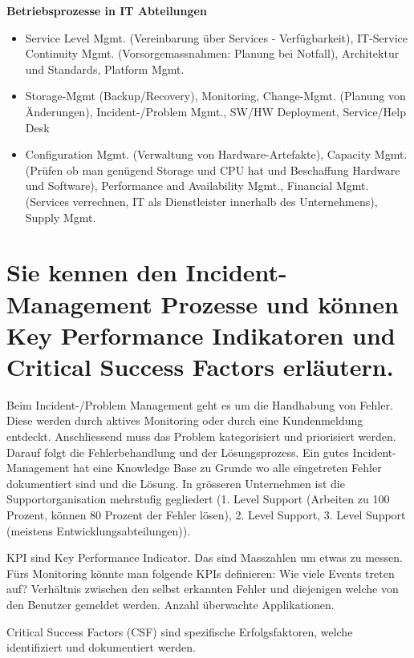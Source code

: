 \textbf{Betriebsprozesse in IT Abteilungen}
\begin{itemize}
	\item Service Level Mgmt. (Vereinbarung über Services - Verfügbarkeit), IT-Service Continuity Mgmt. (Vorsorgemassnahmen: Planung bei Notfall), Architektur und Standards, Platform Mgmt.
	
	\item Storage-Mgmt (Backup/Recovery), Monitoring, Change-Mgmt. (Planung von Änderungen),  Incident-/Problem Mgmt., SW/HW Deployment, Service/Help Desk
	
	\item Configuration Mgmt. (Verwaltung von Hardware-Artefakte), Capacity Mgmt. (Prüfen ob man genügend Storage und CPU hat und Beschaffung Hardware und Software), Performance and Availability Mgmt., Financial Mgmt. (Services verrechnen, IT als Dienstleister innerhalb des Unternehmens), Supply Mgmt.
\end{itemize}

\section{Sie kennen den Incident-Management Prozesse und
	können Key Performance Indikatoren und Critical Success
	Factors erläutern.}

Beim Incident-/Problem Management geht es um die Handhabung von Fehler. Diese werden durch aktives Monitoring oder durch eine Kundenmeldung entdeckt. Anschliessend muss das Problem kategorisiert und priorisiert werden. Darauf folgt die Fehlerbehandlung und der Lösungsprozess. Ein gutes Incident-Management hat eine Knowledge Base zu Grunde wo alle eingetreten Fehler dokumentiert sind und die Lösung. In grösseren Unternehmen ist die Supportorganisation mehrstufig gegliedert (1. Level Support (Arbeiten zu 100 Prozent, können 80 Prozent der Fehler lösen), 2. Level Support, 3. Level Support (meistens Entwicklungsabteilungen)).

KPI sind Key Performance Indicator. Das sind Masszahlen um etwas zu messen. Fürs Monitoring könnte man folgende KPIs definieren: Wie viele Events treten auf? Verhältnis zwischen den selbst erkannten Fehler und diejenigen welche von den Benutzer gemeldet werden. Anzahl überwachte Applikationen.

Critical Success Factors (CSF) sind spezifische Erfolgsfaktoren, welche identifiziert und dokumentiert werden. 